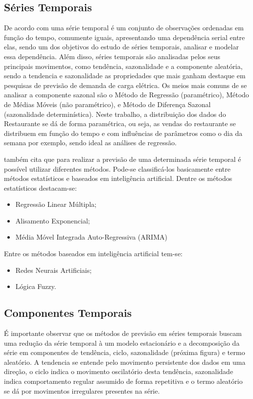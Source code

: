\documentclass[	12pt, Times, openright, twoside, a4paper, english, brazil]{abntex2}
\begin{document}
        \subsection{Séries Temporais}
          De acordo com  \cite{Morettin1987} uma série temporal é um conjunto de observações ordenadas em função do tempo, comumente iguais, apresentando uma dependência serial entre elas, sendo um dos objetivos do estudo de séries temporais, analisar e modelar essa dependência. Além disso, séries temporais são analisadas pelos seus principais movimentos, como tendência, sazonalidade e a componente aleatória, sendo a tendencia e sazonalidade as propriedades que mais ganham destaque em pesquisas de previsão de demanda de carga elétrica. Os meios mais comuns de se analisar a componente sazonal são o Método de Regressão (paramétrico), Método de Médias Móveis (não paramétrico), e Método de Diferença Sazonal (sazonalidade determinística).  Neste trabalho, a distribuição dos dados do Restaurante se dá de forma paramétrica, ou seja, as vendas do restaurante se distribuem em função do tempo e com influências de parâmetros como o dia da semana por exemplo, sendo ideal as análises de regressão. 

          \cite{Almeida2013} também cita que para realizar a previsão de uma determinada série temporal é possível utilizar diferentes métodos. Pode-se classificá-los basicamente entre métodos estatísticos e baseados em inteligência artificial.
          Dentre os métodos estatísticos destacam-se:
          \begin{itemize}
          \item Regressão Linear Múltipla;
          \item Alisamento Exponencial;
          \item Média Móvel Integrada Auto-Regressiva (ARIMA)
          \end{itemize}
          Entre os métodos baseados em inteligência artificial tem-se:
          \begin{itemize}
          \item Redes Neurais Artificiais;
          \item Lógica Fuzzy.
          \end{itemize}

        \subsection{Componentes Temporais}

          É importante observar que os métodos de previsão em séries temporais buscam uma redução da série temporal à um modelo estacionário e a decomposição da série em componentes de tendência, ciclo, sazonalidade (próxima figura) e termo aleatório. A tendencia se entende pelo movimento persistente dos dados em uma direção, o ciclo indica o movimento oscilatório desta tendência, sazonalidade indica comportamento regular assumido de forma repetitiva e o termo aleatório se dá por movimentos irregulares presentes na série.
           
\end{document}
